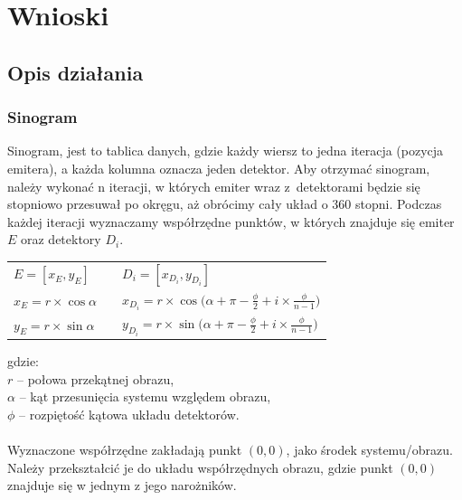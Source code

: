 \documentclass[polish,polish,a4paper]{article}
\begin{document}
	
	\section{Wnioski}
		
		
\iffalse

			\subsection{Opis działania}
				\subsubsection{Sinogram}
				
				Sinogram, jest to tablica danych, 
				gdzie każdy wiersz to jedna iteracja (pozycja emitera), 
				a każda kolumna oznacza jeden detektor.
				Aby otrzymać sinogram, należy wykonać n iteracji, 
				w których emiter wraz z~detektorami będzie się stopniowo przesuwał po okręgu, 
				aż obrócimy cały układ o 360 stopni. 
				Podczas każdej iteracji wyznaczamy współrzędne punktów, w których znajduje się emiter $E$ oraz detektory $D_i$.
				\begin{center}
					\begin{tabular} {l l l}
						$ E = [ x_E, y_E ] $ 	& \hspace{2cm}	 &	$ D_i = [x_{D_i}, y_{D_i}] $
						\\
						$ x_E = r \times \cos{\alpha} $ 	& \hspace{2cm}	 &	 $ x_{D_i} = r \times \cos{\big(\alpha + \pi - \frac{\phi}{2} + i \times \frac{\phi}{n-1}\big)} $
						 \\ 
						$ y_E = r \times \sin{\alpha} $ 	& \hspace{2cm}	 &	 $ y_{D_i} =  r \times \sin{\big(\alpha + \pi - \frac{\phi}{2} + i \times \frac{\phi}{n-1}\big)}$ 
						\\
					\end{tabular}
				\end{center}
				gdzie: \\
				\indent $r$ -- połowa przekątnej obrazu, \\
				\indent $\alpha$ -- kąt przesunięcia systemu względem obrazu, \\
				\indent $\phi$ -- rozpiętość kątowa układu detektorów. \\ \\
				Wyznaczone współrzędne zakładają punkt $(0,0)$, jako środek systemu/obrazu.
				 Należy przekształcić je do układu współrzędnych obrazu,
				  gdzie punkt $(0,0)$ znajduje się w jednym z jego narożników.
				
\end{document}
